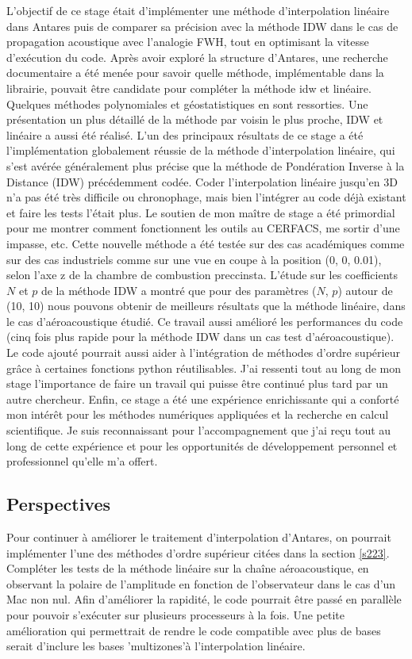L'objectif de ce stage était d'implémenter une méthode d'interpolation linéaire dans Antares puis de comparer sa précision avec la méthode IDW dans le cas de propagation acoustique avec l'analogie FWH, tout en optimisant la vitesse d'exécution du code.
Après avoir exploré la structure d'Antares, une recherche documentaire a été menée pour savoir quelle méthode, implémentable dans la librairie, pouvait être candidate pour compléter la méthode idw et linéaire. Quelques méthodes polynomiales et géostatistiques en sont ressorties. Une présentation un plus détaillé de la méthode par voisin le plus proche, IDW et linéaire a aussi été réalisé.
L'un des principaux résultats de ce stage a été l'implémentation globalement réussie de la méthode d'interpolation linéaire, qui s'est avérée généralement plus précise que la méthode de Pondération Inverse à la Distance (IDW) précédemment codée.
Coder l'interpolation linéaire jusqu'en 3D n'a pas été très difficile ou chronophage, mais bien l'intégrer au code déjà existant et faire les tests l'était plus. Le soutien de mon maître de stage a été primordial pour me montrer comment fonctionnent les outils au CERFACS, me sortir d'une impasse, etc.
Cette nouvelle méthode a été testée sur des cas académiques comme sur des cas industriels comme sur une vue en coupe à la position (0, 0, 0.01), selon l'axe z de la chambre de combustion preccinsta.
L'étude sur les coefficients \(N\) et \(p\) de la méthode IDW a montré que pour des paramètres (\(N\), \(p\)) autour de (10, 10) nous pouvons obtenir de meilleurs résultats que la méthode linéaire, dans le cas d'aéroacoustique étudié.
Ce travail aussi amélioré les performances du code (cinq fois plus rapide pour la méthode IDW dans un cas test d'aéroacoustique).
Le code ajouté pourrait aussi aider à l'intégration de méthodes d'ordre supérieur grâce à certaines fonctions python réutilisables.
J'ai ressenti tout au long de mon stage l'importance de faire un travail qui puisse être continué plus tard par un autre chercheur.
Enfin, ce stage a été une expérience enrichissante qui a conforté mon intérêt pour les méthodes numériques appliquées et la recherche en calcul scientifique. Je suis reconnaissant pour l'accompagnement que j'ai reçu tout au long de cette expérience et pour les opportunités de développement personnel et professionnel qu'elle m'a offert.

\subsection*{Perspectives}
Pour continuer à améliorer le traitement d'interpolation d'Antares, on pourrait implémenter l'une des méthodes d'ordre supérieur citées dans la section \ref{s223}.
Compléter les tests de la méthode linéaire sur la chaîne aéroacoustique, en observant la polaire de l'amplitude en fonction de l'observateur dans le cas d'un Mac non nul.
Afin d'améliorer la rapidité, le code pourrait être passé en parallèle pour pouvoir s’exécuter sur plusieurs processeurs à la fois.
Une petite amélioration qui permettrait de rendre le code compatible avec plus de bases serait d'inclure les bases 'multizones'à l'interpolation linéaire.


